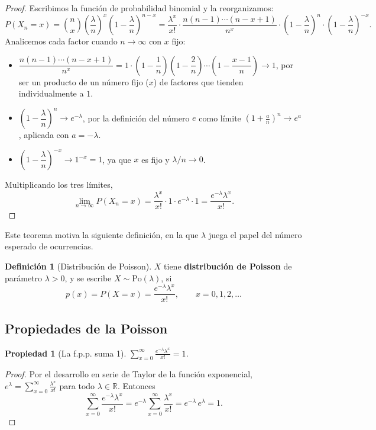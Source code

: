 \documentclass[11pt,a4paper]{article}
\theoremstyle{plain}
\newtheorem{propiedad}[teorema]{Propiedad}
\theoremstyle{definition}
\newtheorem{definicion}[teorema]{Definición}
\theoremstyle{remark}
\begin{document}
\begin{proof}
Escribimos la función de probabilidad binomial y la reorganizamos:
$$P(X_n=x)=\binom{n}{x}\left(\frac{\lambda}{n}\right)^x\left(1-\frac{\lambda}{n}\right)^{n-x}=\frac{\lambda^x}{x!}\cdot\frac{n(n-1)\cdots(n-x+1)}{n^x}\cdot\left(1-\frac{\lambda}{n}\right)^{n}\cdot\left(1-\frac{\lambda}{n}\right)^{-x}.$$
Analicemos cada factor cuando $n\to\infty$ con $x$ fijo:
\begin{itemize}
\item $\dfrac{n(n-1)\cdots(n-x+1)}{n^x}=1\cdot\left(1-\dfrac1n\right)\left(1-\dfrac2n\right)\cdots\left(1-\dfrac{x-1}{n}\right)\longrightarrow 1$, por ser un producto de un número fijo ($x$) de factores que tienden individualmente a $1$.
\item $\left(1-\dfrac{\lambda}{n}\right)^{n}\longrightarrow e^{-\lambda}$, por la definición del número $e$ como límite $\left(1+\frac{a}{n}\right)^n\to e^a$, aplicada con $a=-\lambda$.
\item $\left(1-\dfrac{\lambda}{n}\right)^{-x}\longrightarrow 1^{-x}=1$, ya que $x$ es fijo y $\lambda/n\to0$.
\end{itemize}
Multiplicando los tres límites,
$$\lim_{n\to\infty}P(X_n=x)=\frac{\lambda^x}{x!}\cdot1\cdot e^{-\lambda}\cdot1=\frac{e^{-\lambda}\lambda^x}{x!}.$$
\end{proof}

Este teorema motiva la siguiente definición, en la que $\lambda$ juega el papel del número esperado de ocurrencias.

\begin{definicion}[Distribución de Poisson]
$X$ tiene \textbf{distribución de Poisson} de parámetro $\lambda>0$, y se escribe $X\sim\text{Po}(\lambda)$, si
$$p(x)=P(X=x)=\frac{e^{-\lambda}\lambda^x}{x!},\qquad x=0,1,2,\dots$$
\end{definicion}

\subsection{Propiedades de la Poisson}

\begin{propiedad}[La f.p.p. suma 1]
$\displaystyle\sum_{x=0}^\infty\frac{e^{-\lambda}\lambda^x}{x!}=1$.
\end{propiedad}
\begin{proof}
Por el desarrollo en serie de Taylor de la función exponencial, $e^{\lambda}=\displaystyle\sum_{x=0}^\infty\frac{\lambda^x}{x!}$ para todo $\lambda\in\mathbb{R}$. Entonces
$$\sum_{x=0}^\infty\frac{e^{-\lambda}\lambda^x}{x!}=e^{-\lambda}\sum_{x=0}^\infty\frac{\lambda^x}{x!}=e^{-\lambda}\,e^{\lambda}=1.$$
\end{proof}
\end{document}
